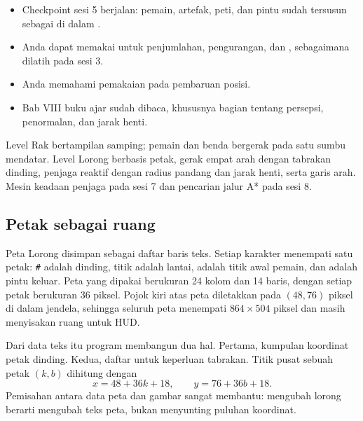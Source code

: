 
\begin{prasyaratbox}
\begin{itemize}[leftmargin=1.4em, itemsep=0.25em]
  \item Checkpoint sesi 5 berjalan: pemain, artefak, peti, dan pintu sudah
        tersusun sebagai  di dalam .
  \item Anda dapat memakai  untuk penjumlahan,
        pengurangan, dan , sebagaimana dilatih pada sesi 3.
  \item Anda memahami pemakaian  pada pembaruan posisi.
  \item Bab VIII buku ajar sudah dibaca, khususnya bagian tentang persepsi,
        penormalan, dan jarak henti.
\end{itemize}
\end{prasyaratbox}


\petasesi
  {Level Rak bertampilan samping; pemain dan benda bergerak pada satu sumbu
   mendatar.}
  {Level Lorong berbasis petak, gerak empat arah dengan tabrakan dinding,
   penjaga reaktif dengan radius pandang dan jarak henti, serta garis arah.}
  {Mesin keadaan penjaga pada sesi 7 dan pencarian jalur A* pada sesi 8.}


\subsection*{Petak sebagai ruang}

Peta Lorong disimpan sebagai daftar baris teks. Setiap karakter menempati satu
petak: \texttt{\#} adalah dinding, titik adalah lantai,  adalah titik awal
pemain, dan  adalah pintu keluar. Peta yang dipakai berukuran 24 kolom
dan 14 baris, dengan setiap petak berukuran 36 piksel. Pojok kiri atas peta
diletakkan pada $(48, 76)$ piksel di dalam jendela, sehingga seluruh peta
menempati $864 \times 504$ piksel dan masih menyisakan ruang untuk HUD.

Dari data teks itu program membangun dua hal. Pertama, kumpulan koordinat
petak dinding. Kedua, daftar  untuk keperluan tabrakan. Titik
pusat sebuah petak $(k, b)$ dihitung dengan
\[
x = 48 + 36k + 18, \qquad y = 76 + 36b + 18 .
\]
Pemisahan antara data peta dan gambar sangat membantu: mengubah lorong berarti
mengubah teks peta, bukan menyunting puluhan koordinat.

